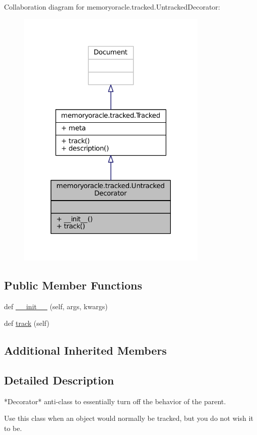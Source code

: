 Collaboration diagram for memoryoracle.\+tracked.\+Untracked\+Decorator\+:
\nopagebreak
\begin{figure}[H]
\begin{center}
\leavevmode
\includegraphics[width=258pt]{classmemoryoracle_1_1tracked_1_1UntrackedDecorator__coll__graph}
\end{center}
\end{figure}
\subsection*{Public Member Functions}
\begin{DoxyCompactItemize}
\item 
def \hyperlink{classmemoryoracle_1_1tracked_1_1UntrackedDecorator_a97fa3cc1a3ad5dc2ff44b7b0fdedd1bb}{\+\_\+\+\_\+init\+\_\+\+\_\+} (self, args, kwargs)
\item 
def \hyperlink{classmemoryoracle_1_1tracked_1_1UntrackedDecorator_af480ef42d03cf8351c201e3f726ff8d2}{track} (self)
\end{DoxyCompactItemize}
\subsection*{Additional Inherited Members}


\subsection{Detailed Description}
\begin{DoxyVerb}*Decorator* anti-class to essentially turn off the behavior of the parent.

Use this class when an object would normally be tracked, but you do not
wish it to be.
\end{DoxyVerb}
 

